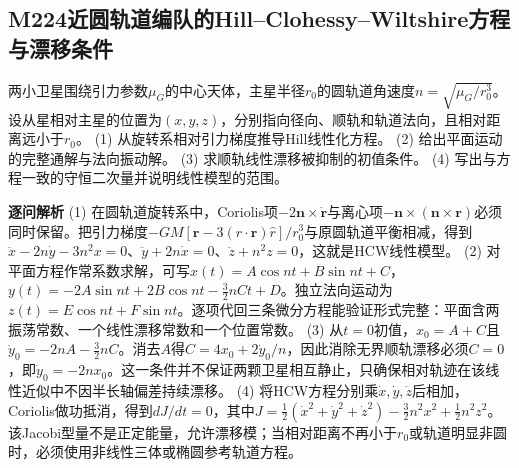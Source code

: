\subsection*{M224\quad 近圆轨道编队的Hill–Clohessy–Wiltshire方程与漂移条件}
两小卫星围绕引力参数$\mu_G$的中心天体，主星半径$r_0$的圆轨道角速度$n=\sqrt{\mu_G/r_0^3}$。设从星相对主星的位置为$(x,y,z)$，分别指向径向、顺轨和轨道法向，且相对距离远小于$r_0$。
(1) 从旋转系相对引力梯度推导Hill线性化方程。
(2) 给出平面运动的完整通解与法向振动解。
(3) 求顺轨线性漂移被抑制的初值条件。
(4) 写出与方程一致的守恒二次量并说明线性模型的范围。
\par\textbf{逐问解析}
(1) 在圆轨道旋转系中，Coriolis项$-2\boldsymbol n\times\dot{\boldsymbol r}$与离心项$-\boldsymbol n\times(\boldsymbol n\times\boldsymbol r)$必须同时保留。把引力梯度$-GM[\boldsymbol r-3(\hat r\cdot\boldsymbol r)\hat r]/r_0^3$与原圆轨道平衡相减，得到$\ddot x-2n\dot y-3n^2x=0$、$\ddot y+2n\dot x=0$、$\ddot z+n^2z=0$，这就是HCW线性模型。
(2) 对平面方程作常系数求解，可写$x(t)=A\cos nt+B\sin nt+C$，$y(t)=-2A\sin nt+2B\cos nt-\frac32nCt+D$。独立法向运动为$z(t)=E\cos nt+F\sin nt$。逐项代回三条微分方程能验证形式完整：平面含两振荡常数、一个线性漂移常数和一个位置常数。
(3) 从$t=0$初值，$x_0=A+C$且$\dot y_0=-2nA-\frac32nC$。消去$A$得$C=4x_0+2\dot y_0/n$，因此消除无界顺轨漂移必须$C=0$，即$\dot y_0=-2nx_0$。这一条件并不保证两颗卫星相互静止，只确保相对轨迹在该线性近似中不因半长轴偏差持续漂移。
(4) 将HCW方程分别乘$\dot x,\dot y,\dot z$后相加，Coriolis做功抵消，得到$dJ/dt=0$，其中$J=\frac12(\dot x^2+\dot y^2+\dot z^2)-\frac32n^2x^2+\frac12n^2z^2$。该Jacobi型量不是正定能量，允许漂移模；当相对距离不再小于$r_0$或轨道明显非圆时，必须使用非线性三体或椭圆参考轨道方程。
\par\medskip
